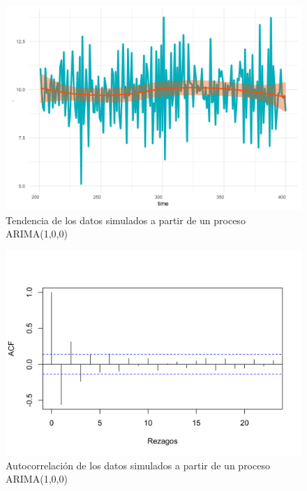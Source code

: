 \documentclass[
]{article}
\begin{document}
\begin{figure}[H]
\includegraphics[width=1\linewidth,height=1\textheight]{Tesis_files/figure-latex/arima100_comportamiento-1} \caption{Tendencia de los datos simulados a partir de un proceso ARIMA(1,0,0)}\label{fig:arima100_comportamiento}
\end{figure}

\begin{figure}[H]
\includegraphics[width=1\linewidth,height=1\textheight]{Tesis_files/figure-latex/arima100_acf-1} \caption{Autocorrelación de los datos simulados a partir de un proceso ARIMA(1,0,0)}\label{fig:arima100_acf}
\end{figure}
\end{document}
